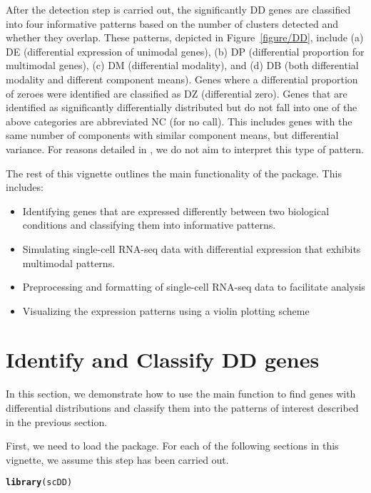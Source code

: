 \documentclass{article}\usepackage[]{graphicx}\usepackage[]{color}
\makeatletter
\newcommand{\hlstd}[1]{\textcolor[rgb]{0.345,0.345,0.345}{#1}}%
\newcommand{\hlkwd}[1]{\textcolor[rgb]{0.737,0.353,0.396}{\textbf{#1}}}%
\newenvironment{kframe}{%
 \def\at@end@of@kframe{}%
 \ifinner\ifhmode%
  \def\at@end@of@kframe{\end{minipage}}%
  \begin{minipage}{\columnwidth}%
 \fi\fi%
 \def\FrameCommand##1{\hskip\@totalleftmargin \hskip-\fboxsep
 \colorbox{shadecolor}{##1}\hskip-\fboxsep
     \hskip-\linewidth \hskip-\@totalleftmargin \hskip\columnwidth}%
 \MakeFramed {\advance\hsize-\width
   \@totalleftmargin\z@ \linewidth\hsize
   \@setminipage}}%
 {\par\unskip\endMakeFramed%
 \at@end@of@kframe}
\newenvironment{knitrout}{}{} %
\makeatother
\begin{document}
After the detection step is carried out, the significantly DD genes are classified into four informative patterns based on the number of clusters detected and whether they overlap.  These patterns, depicted in Figure~\ref{figure/DD}, include (a) DE (differential expression of unimodal genes), (b) DP (differential proportion for multimodal genes), (c) DM (differential modality), and (d) DB (both differential modality and different component means).  Genes where a differential proportion of zeroes were identified are classified as DZ (differential zero).  Genes that are identified as significantly differentially distributed but do not fall into one of the above categories are abbreviated NC (for no call). This includes genes with the same number of components with similar component means, but differential variance.  For reasons detailed in \cite{korthauer2015}, we do not aim to interpret this type of pattern.


The rest of this vignette outlines the main functionality of the  package.  This includes:

\begin{itemize}
  \item Identifying genes that are expressed differently between two biological conditions and classifying them into informative patterns.
  \item Simulating single-cell RNA-seq data with differential expression that exhibits multimodal patterns.
  \item Preprocessing and formatting of single-cell RNA-seq data to facilitate analysis
  \item Visualizing the expression patterns using a violin plotting scheme
\end{itemize}

\section{Identify and Classify DD genes}
In this section, we demonstrate how to use the main function  to find genes with differential distributions and classify them into the patterns of interest described in the previous section. 

First, we need to load the  package.  For each of the following sections in this vignette, we assume this step has been carried out.
\begin{knitrout}
\color{fgcolor}\begin{kframe}
\begin{alltt}
\hlkwd{library}\hlstd{(scDD)}
\end{alltt}
\end{kframe}
\end{knitrout}
\end{document}
